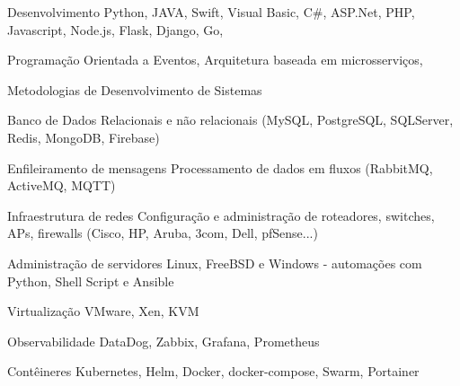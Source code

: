 

\begin{cvskills}

\cvskill
    {Desenvolvimento} %
    {Python, JAVA, Swift, Visual Basic, C\#, ASP.Net, PHP, Javascript, Node.js, Flask, Django, Go,} %

\cvskill
    {} %
    {Programação Orientada a Eventos, Arquitetura baseada em microsserviços, } %

\cvskill
    {} %
    {Metodologias de Desenvolvimento de Sistemas} %



\cvskill
    {Banco de Dados} %
    {Relacionais e não relacionais (MySQL, PostgreSQL, SQLServer, Redis, MongoDB, Firebase)} %


\cvskill
    {Enfileiramento de mensagens} %
    {Processamento de dados em fluxos (RabbitMQ, ActiveMQ, MQTT)} %

\cvskill
    {Infraestrutura de redes} %
    {Configuração e administração de roteadores, switches, APs, firewalls (Cisco, HP, Aruba, 3com, Dell, pfSense...)} %

\cvskill
    {Administração de servidores} %
    {Linux, FreeBSD e Windows - automações com Python, Shell Script e Ansible} %

\cvskill
    {Virtualização} %
    {VMware, Xen, KVM} %

\cvskill
    {Observabilidade} %
    {DataDog, Zabbix, Grafana, Prometheus} %


\cvskill
    {Contêineres} %
    {Kubernetes, Helm, Docker, docker-compose, Swarm, Portainer} %


\end{cvskills}
